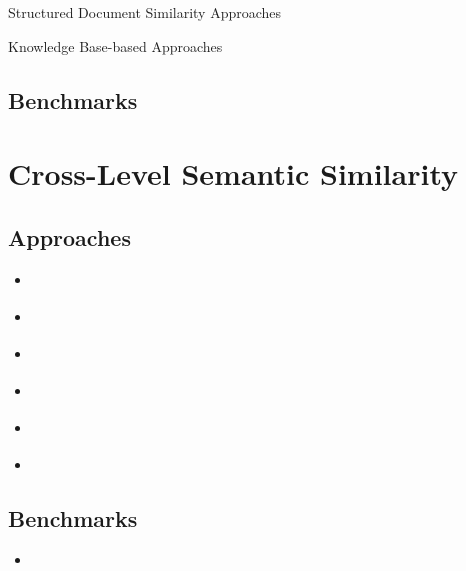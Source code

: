 \documentclass[fullname]{clv2}
\begin{document}
\noindent Structured Document Similarity Approaches
\begin{enumerate*}
\item  \cite{wilkinson1994effective}
\item \cite{tekli2009overview}
\item \cite{huang2013learning}
\item \cite{xiong2015esdrank}

\end{enumerate*}


\noindent Knowledge Base-based Approaches
\begin{enumerate*}
\item \cite{lakkaraju2008document}
\item \cite{yazdani2013computing}
\item \cite{schuhmacher2014knowledge}
\item \cite{franco2014knowledge}
\end{enumerate*}

\subsection{Benchmarks}

\begin{enumerate*}
\item \cite{lee2005empirical}
\end{enumerate*}



\section{Cross-Level Semantic Similarity}

\subsection{Approaches}
\begin{itemize}
\item \cite{biccici2014rtm}
\item \cite{kashyap2014meerkat}
\item \cite{jimenez2014unal}
\item \cite{chavez2014umcc_dlsi_semsim}
\item \cite{pedersen2014duluth}
\item \cite{pilehvar2015senses}
\end{itemize}

\subsection{Benchmarks}
\begin{itemize}
\item \cite{jurgens2014semeval}
\end{itemize}
\end{document}
